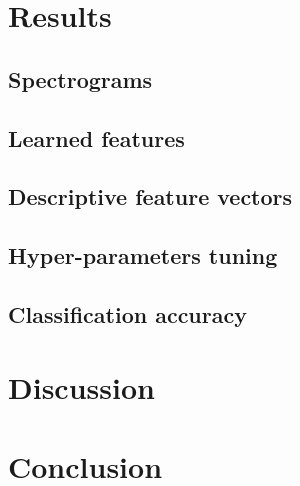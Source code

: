 \documentclass[a4paper,12pt,twoside]{report}
\begin{document}
\chapter{Results}

\section{Spectrograms}

\section{Learned features}

\section{Descriptive feature vectors}

\section{Hyper-parameters tuning}

\section{Classification accuracy}

\chapter{Discussion}

\chapter*{Conclusion}
\end{document}
